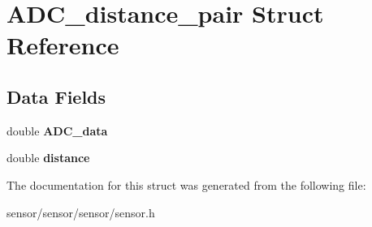 \hypertarget{struct_a_d_c__distance__pair}{}\section{A\+D\+C\+\_\+distance\+\_\+pair Struct Reference}
\label{struct_a_d_c__distance__pair}
\subsection*{Data Fields}
\begin{DoxyCompactItemize}
\item 
double {\bfseries A\+D\+C\+\_\+data}\hypertarget{struct_a_d_c__distance__pair_aa001cc67b1ec73e43eb6bd32d24a739b}{}\label{struct_a_d_c__distance__pair_aa001cc67b1ec73e43eb6bd32d24a739b}

\item 
double {\bfseries distance}\hypertarget{struct_a_d_c__distance__pair_a79b8e036dca6911e3295a47d99f21f43}{}\label{struct_a_d_c__distance__pair_a79b8e036dca6911e3295a47d99f21f43}

\end{DoxyCompactItemize}


The documentation for this struct was generated from the following file\+:\begin{DoxyCompactItemize}
\item 
sensor/sensor/sensor/sensor.\+h\end{DoxyCompactItemize}
